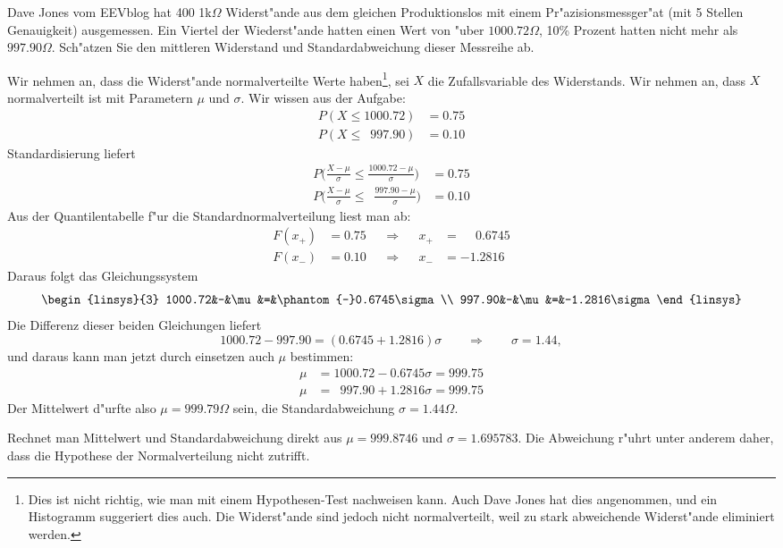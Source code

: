 Dave Jones vom EEVblog hat 400 1k$\Omega$ Widerst"ande aus dem gleichen
Produktionslos mit einem Pr"azisionsmessger"at (mit 5 Stellen
Genauigkeit) ausgemessen. 
Ein Viertel der Wiederst"ande hatten einen Wert von "uber $1000.72\Omega$,
10\% Prozent hatten nicht mehr als $997.90\Omega$.
Sch"atzen Sie den mittleren Widerstand und Standardabweichung dieser
Messreihe ab.

\begin{loesung}
Wir nehmen an, dass die Widerst"ande normalverteilte Werte haben\footnote{
Dies ist nicht richtig, wie man mit einem Hypothesen-Test nachweisen kann.
Auch Dave Jones hat dies angenommen, und ein Histogramm suggeriert
dies auch. Die Widerst"ande sind jedoch nicht normalverteilt, weil zu
stark abweichende Widerst"ande eliminiert werden.}, sei $X$ die Zufallsvariable
des Widerstands.
Wir nehmen an, dass $X$ normalverteilt ist mit Parametern $\mu$ und $\sigma$.
Wir wissen aus der Aufgabe:
\begin{align*}
P(X\le 1000.72)&=0.75
\\
P(X\le \phantom{0}997.90)&=0.10
\end{align*}
Standardisierung liefert
\begin{align*}
P\biggl(\frac{X-\mu}{\sigma}\le \frac{1000.72-\mu}{\sigma}\biggr)&=0.75
\\
P\biggl(\frac{X-\mu}{\sigma}\le \phantom{0}\frac{997.90-\mu}{\sigma}\biggr)&=0.10
\end{align*}
Aus der Quantilentabelle f"ur die Standardnormalverteilung liest man ab:
\[
\begin{aligned}
F(x_+)&=0.75&&\Rightarrow&&x_+&=\phantom{-}0.6745\\
F(x_-)&=0.10&&\Rightarrow&&x_-&=-1.2816
\end{aligned}
\]
Daraus folgt das Gleichungssystem
\[
\begin{linsys}{3}
1000.72&-&\mu&=&\phantom{-}0.6745\sigma\\
 997.90&-&\mu&=&-1.2816\sigma
\end{linsys}
\]
Die Differenz dieser beiden Gleichungen liefert
\[
1000.72-997.90 = (0.6745 + 1.2816)\sigma
\qquad
\Rightarrow
\qquad
\sigma = 1.44,
\]
und daraus kann man jetzt durch einsetzen auch $\mu$ bestimmen:
\begin{align*}
\mu&=1000.72-0.6745\sigma=999.75\\
\mu&=\phantom{0}997.90+1.2816\sigma=999.75
\end{align*}
Der Mittelwert d"urfte also $\mu=999.79\Omega$ sein, die Standardabweichung
$\sigma=1.44\Omega$.
\end{loesung}

\begin{diskussion}
Rechnet man Mittelwert und Standardabweichung direkt aus
$\mu=999.8746$ und $\sigma=1.695783$.
Die Abweichung r"uhrt unter anderem daher, dass die Hypothese der
Normalverteilung nicht zutrifft.
\end{diskussion}



